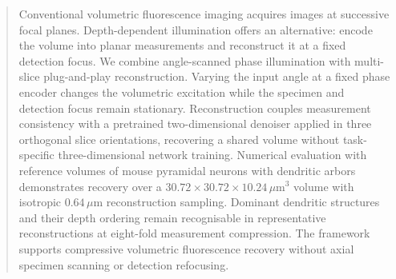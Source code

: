 \begin{abstract}
Conventional volumetric fluorescence imaging acquires images at successive focal planes.
Depth-dependent illumination offers an alternative: encode the volume into planar
measurements and reconstruct it at a fixed detection focus. We combine angle-scanned
phase illumination with multi-slice plug-and-play reconstruction. Varying the input angle
at a fixed phase encoder changes the volumetric excitation while the specimen and
detection focus remain stationary. Reconstruction couples measurement consistency with
a pretrained two-dimensional denoiser applied in three orthogonal slice orientations,
recovering a shared volume without task-specific three-dimensional network training.
Numerical evaluation with reference volumes of mouse pyramidal neurons with dendritic
arbors demonstrates recovery over a
\(30.72\times30.72\times10.24\,\mu\mathrm m^3\) volume with isotropic
\(0.64\,\mu\mathrm m\) reconstruction sampling. Dominant dendritic structures and their
depth ordering remain recognisable in representative reconstructions at eight-fold
measurement compression. The framework supports compressive volumetric fluorescence
recovery without axial specimen scanning or detection refocusing.
\end{abstract}
